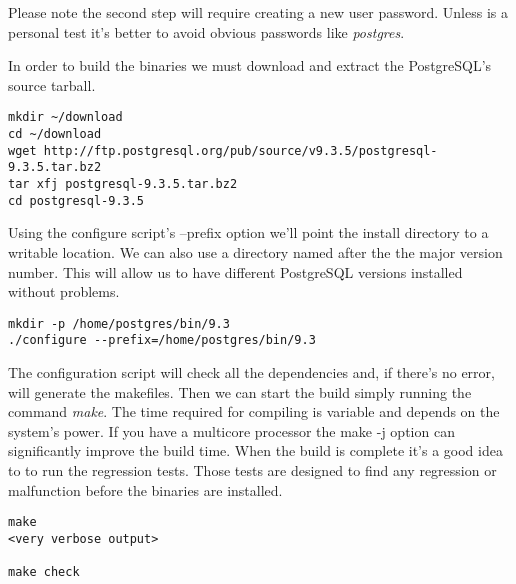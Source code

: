 %
%

Please note the second step will require creating a new user password. Unless is a personal
test it's better to avoid obvious passwords like \textit{postgres}.\newline

In order to build the binaries we must download and extract the PostgreSQL's source tarball.

\begin{verbatim}
mkdir ~/download
cd ~/download
wget http://ftp.postgresql.org/pub/source/v9.3.5/postgresql-9.3.5.tar.bz2
tar xfj postgresql-9.3.5.tar.bz2
cd postgresql-9.3.5
\end{verbatim}


Using the configure script's --prefix option we'll point the install directory to a writable
location. We can also use a directory named after the the major version number. This will allow
us to have different PostgreSQL versions installed without problems.

\begin{verbatim}
mkdir -p /home/postgres/bin/9.3
./configure --prefix=/home/postgres/bin/9.3
\end{verbatim}

The configuration script will check all the dependencies and, if there's no error, will generate
the makefiles. Then we can start the build simply running the command \textit{make}. The time
required for compiling is variable and depends on the system's power. If you have a multicore
processor the make -j option can significantly improve the build time. When the build is complete
it's a good idea to to run the regression tests. Those tests are designed to find any regression or
malfunction before the binaries are installed.

\begin{verbatim}
make
<very verbose output>

make check

\end{verbatim}

